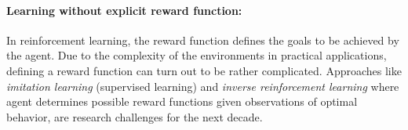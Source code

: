 \paragraph{Learning without explicit reward function:}
In reinforcement learning, the reward function defines the goals to
be achieved by the agent. Due to the complexity of the environments in practical
applications, defining a reward function can turn out to be rather
complicated. Approaches like {\em imitation learning} (supervised learning) and {\em inverse reinforcement learning} where agent determines possible reward functions given observations of optimal behavior, are research challenges for the next decade.





